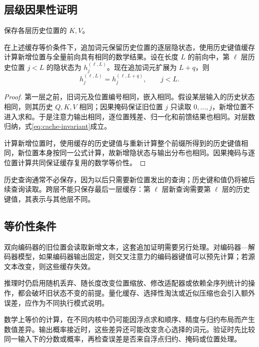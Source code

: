\documentclass[../textbook.tex]{subfiles}
\begin{document}
\subsection{层级因果性证明}
保存各层历史位置的 $K,V$。\begin{proposition}[因果网络的缓存等价性]
在上述缓存等价条件下，追加词元保留历史位置的逐层隐状态，使用历史键值缓存计算新增位置与全量前向具有相同的数学结果。设在长度 $L$ 的前向中，第 $\ell$ 层历史位置 $j<L$ 的隐状态为 $h_j^{(\ell,L)}$。现在追加词元扩展为 $L+q$，则
\begin{equation}
 h_j^{(\ell,L)}=h_j^{(\ell,L+q)},\qquad j<L.
 \label{eq:cache-invariant}
\end{equation}
\end{proposition}
\begin{proof}
第一层之前，旧词元及位置编号相同，嵌入相同。假设某层输入的历史状态相同，则其历史 $Q,K,V$ 相同；因果掩码保证旧位置 $j$ 只读取 $0,\ldots,j$，新增位置不进入求和。于是注意力输出相同，逐位置残差、归一化和前馈结果也相同。对层数归纳，式\eqref{eq:cache-invariant}成立。

计算新增位置时，使用缓存的历史键值与重新计算整个前缀所得到的历史键值相同，新位置本身按同一公式计算，故新增隐状态与输出分布也相同。因果掩码与逐位置计算共同保证缓存复用的数学等价性。

\end{proof}

历史查询通常不必保存，因为以后只需要新位置发出的查询；历史键和值仍将被后续查询读取。跨层不能只保存最后一层缓存：第 $\ell$ 层新查询需要第 $\ell$ 层的历史键值，其表示与其他层不同。

\subsection{等价性条件}
双向编码器的旧位置会读取新增文本，这套追加证明需要另行处理。对编码器—解码器模型，如果编码器输出固定，则交叉注意力的编码器键值可以预先计算；若源文本改变，则这些缓存失效。

推理时仍启用随机丢弃、随长度改变位置缩放、修改适配器或依赖全序列统计的操作，都会破坏旧状态不变的前提。量化缓存、选择性淘汰或近似压缩也会引入额外误差，应作为不同执行模式说明。

数学上等价的计算，在不同内核中仍可能因浮点求和顺序、精度与归约布局而产生数值差异。输出概率接近时，这些差异还可能改变贪心选择的词元。验证时先比较同一输入下的分数或概率，再检查误差是否来自浮点归约、掩码或位置处理。
\end{document}
